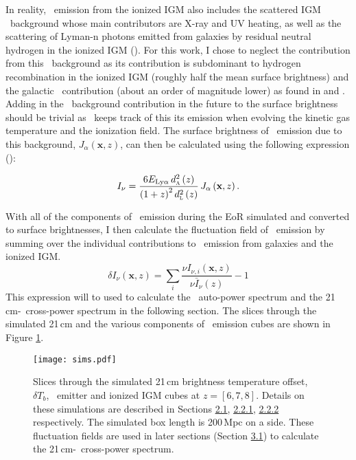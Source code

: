 In reality, \lya\ emission from the ionized IGM also includes the scattered IGM \lya\
background whose main contributors are X-ray and UV heating, as well as the scattering of Lyman-n
photons emitted from galaxies by residual neutral hydrogen in the ionized IGM (\cite{2007MNRAS.376.1680P}).
For this work, I chose to neglect the contribution from this \lya\ background as its contribution
is subdominant to hydrogen recombination in the ionized IGM (roughly half the mean surface brightness)
and the galactic \lya\ contribution (about an order of magnitude lower) as found in \cite{2013ApJ...763..132S} and
\cite{2017ApJ...848...52H}. Adding in
the \lya\ background contribution in the future to the surface brightness should be
trivial as \fastsim\ keeps track of this its emission when evolving the kinetic
gas temperature and the ionization field. The surface brightness
of \lya\ emission due to this background, $J_{\alpha} \left( \textbf{x}, z\right)$, can then be
calculated using the following expression (\cite{2013ApJ...763..132S}):

\begin{equation}
  I_{\nu} = \frac{6 E_{\text{Ly}\alpha}\, d_\textsc{a}^2 \left(z \right)}{\left( 1 + z\right)^2 d_\textsc{l}^2 \left( z \right)}\, J_{\alpha} \left( \textbf{x}, z \right).
\end{equation}

With all of the components of \lya\ emission during the EoR simulated and converted to surface brightnesses,
I then calculate the fluctuation field of \lya\ emission by summing over the individual
contributions to \lya\ emission from galaxies and the ionized IGM.
\begin{equation}
  \delta I_{\nu} \left(\textbf{x}, z \right) = \sum_i \frac{\nu I_{\nu, i} \left(\textbf{x}, z \right)}{\nu \bar{I}_{\nu} \left(z \right)} - 1
\end{equation}
This expression will to used to calculate the \lya\ auto-power spectrum and the 21\,cm-\lya\
cross-power spectrum in the following section. The slices through the simulated 21\,cm and the various
components of \lya\ emission cubes are shown in Figure \ref{fig:sims}.

\begin{figure}[p]
	\centering
	\texttt{[image: sims.pdf]}
	\caption[Simulated 21cm and \lya\ emission]{Slices through the simulated 21\,cm brightness temperature offset, $\delta T_b$, \lya\ emitter and ionized IGM cubes at $z = \left[6, 7, 8\right]$. Details on these simulations are described in Sections \hyperref[sec:21cm_temp]{2.1}, \hyperref[ref:laes]{2.2.1}, \hyperref[sec:ionized_igm]{2.2.2} respectively. The simulated box length is 200\,Mpc on a side. These fluctuation fields are used in later sections (Section \hyperref[sec:cross-power]{3.1}) to calculate the 21\,cm-\lya\ cross-power spectrum.}
	\label{fig:sims}
\end{figure}
